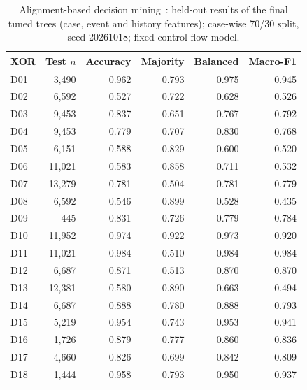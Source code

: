 \begin{table}[t]
\centering
\caption{Alignment-based decision mining~\cite{deleoni2013dataaware}: held-out results of the final tuned trees (case, event and history features); case-wise 70/30 split, seed 20261018; fixed control-flow model.}
\label{tab:decision-mining}
\begin{tabular}{lrrrrr}
\hline
XOR & Test $n$ & Accuracy & Majority & Balanced & Macro-F1 \\
\hline
D01 & 3,490 & 0.962 & 0.793 & 0.975 & 0.945 \\
D02 & 6,592 & 0.527 & 0.722 & 0.628 & 0.526 \\
D03 & 9,453 & 0.837 & 0.651 & 0.767 & 0.792 \\
D04 & 9,453 & 0.779 & 0.707 & 0.830 & 0.768 \\
D05 & 6,151 & 0.588 & 0.829 & 0.600 & 0.520 \\
D06 & 11,021 & 0.583 & 0.858 & 0.711 & 0.532 \\
D07 & 13,279 & 0.781 & 0.504 & 0.781 & 0.779 \\
D08 & 6,592 & 0.546 & 0.899 & 0.528 & 0.435 \\
D09 & 445 & 0.831 & 0.726 & 0.779 & 0.784 \\
D10 & 11,952 & 0.974 & 0.922 & 0.973 & 0.920 \\
D11 & 11,021 & 0.984 & 0.510 & 0.984 & 0.984 \\
D12 & 6,687 & 0.871 & 0.513 & 0.870 & 0.870 \\
D13 & 12,381 & 0.580 & 0.890 & 0.663 & 0.494 \\
D14 & 6,687 & 0.888 & 0.780 & 0.888 & 0.793 \\
D15 & 5,219 & 0.954 & 0.743 & 0.953 & 0.941 \\
D16 & 1,726 & 0.879 & 0.777 & 0.860 & 0.836 \\
D17 & 4,660 & 0.826 & 0.699 & 0.842 & 0.809 \\
D18 & 1,444 & 0.958 & 0.793 & 0.950 & 0.937 \\
\hline
\end{tabular}
\end{table}
